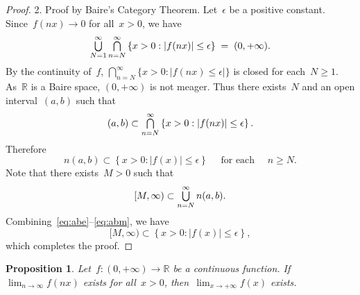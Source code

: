 \documentclass[11pt,a4paper]{article}
\newtheorem{proposition}{Proposition}[section]
\theoremstyle{definition}
\DeclareMathOperator*{\mcap}{\mathsmaller{\bigcap}}
\DeclareMathOperator*{\mcup}{\mathsmaller{\bigcup}}
\def\real{\mathbb{R}}
\numberwithin{equation}{section}
\begin{document}
\begin{proof}
  2. Proof by Baire's Category Theorem. Let~$\epsilon$ be a positive constant. Since~$f(nx)\to 0$
     for all~$x>0$, we have 
  \begin{equation}
    \mcup_{N=1}^\infty \mcap_{n=N}^\infty\left\{ x >0 \mathrel{:} |f(nx)| \le \epsilon \right\}
    \;=\; (0,+\infty).
  \end{equation}
  By the continuity of~$f$, $\bigcap_{n=N}^\infty \{x> 0 \mathrel{:} |f(nx)\le \epsilon|\}$ is closed for
  each~$N \ge 1$.
  As~$\real$ is a Baire space, $(0,+\infty)$ is not meager. Thus there exists~$N$ and an open
  interval~$(a, b)$ such that  
  \begin{equation}
    (a, b) \subset \mcap_{n=N}^\infty\left\{ x >0 \mathrel{:} |f(nx)| \le \epsilon \right\}.
  \end{equation}
  Therefore
  \begin{equation}
    \label{eq:abe}
    n(a, b) \subset \left\{ x >0 \mathrel{:} |f(x)| \le \epsilon \right\}
    \quad \text{ for each } \quad n\ge N.
  \end{equation}
  Note that there exists~$M >0$ such that 
  \begin{equation}
    \label{eq:abm}
    [M, \infty) \subset \mcup_{n=N}^\infty n(a,b). 
  \end{equation}
  Combining~\eqref{eq:abe}--\eqref{eq:abm}, we have
  \begin{equation}
    [M, \infty) \subset \left\{ x >0 \mathrel{:} |f(x)| \le \epsilon \right\}, 
  \end{equation}
  which completes the proof. 

\end{proof}

\begin{proposition}
  Let~$f\mathrel{:} (0,+\infty)\to \real$ be a continuous function. If~$\lim_{n\to \infty}f(nx)$ 
  exists for all~$x>0$, then~$\lim_{x\to +\infty} f(x)$ exists.
\end{proposition}



\small


\end{document}
